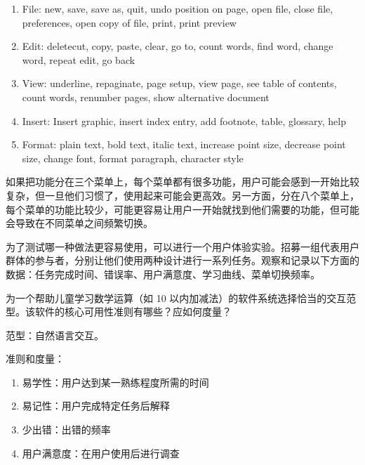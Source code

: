 \begin{solution}
\begin{enumerate}[label=\arabic*.]
    \item File: new, save, save as, quit, undo position on page, open file, close file, preferences, open copy of file, print, print preview
    \item Edit: deletecut, copy, paste, clear, go to, count words,  find word, change word, repeat edit,  go back
    \item View: underline, repaginate, page setup, view page, see table of contents, count words, renumber pages, show alternative document
    \item Insert: Insert graphic, insert index entry, add footnote, table, glossary, help
    \item Format: plain text, bold text, italic text, increase point size, decrease point size, change font, format paragraph, character style
\end{enumerate}

如果把功能分在三个菜单上，每个菜单都有很多功能，用户可能会感到一开始比较复杂，但一旦他们习惯了，使用起来可能会更高效。另一方面，分在八个菜单上，每个菜单的功能比较少，可能更容易让用户一开始就找到他们需要的功能，但可能会导致在不同菜单之间频繁切换。

为了测试哪一种做法更容易使用，可以进行一个用户体验实验。招募一组代表用户群体的参与者，分别让他们使用两种设计进行一系列任务。观察和记录以下方面的数据：任务完成时间、错误率、用户满意度、学习曲线、菜单切换频率。

\end{solution}



\begin{problem}[2012]
为一个帮助儿童学习数学运算（如 10 以内加减法）的软件系统选择恰当的交互范型。该软件的核心可用性准则有哪些？应如何度量？
\end{problem}

\begin{solution}
范型：自然语言交互。

准则和度量：
\vspace{-0.8em}
\begin{multicols}{2}
    \begin{enumerate}[label=\arabic*.]
        \item 易学性：用户达到某一熟练程度所需的时间
        \item 易记性：用户完成特定任务后解释
        \item 少出错：出错的频率
        \item 用户满意度：在用户使用后进行调查
    \end{enumerate}
\end{multicols}
\vspace{-1em}
\end{solution}



